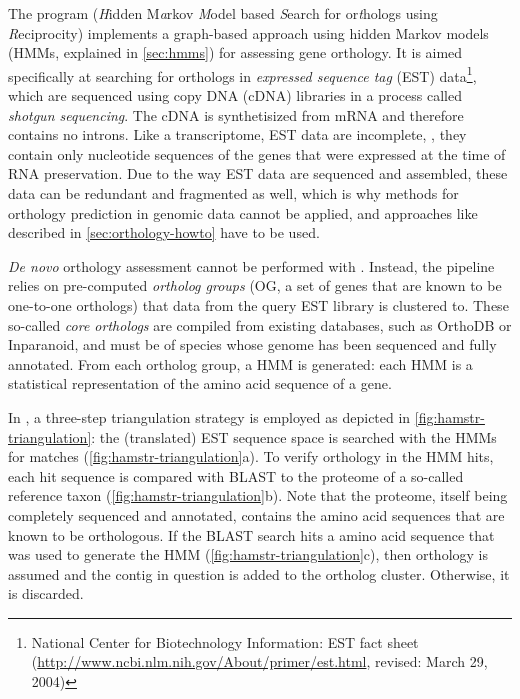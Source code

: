 \label{sec:hamstr}
The program \hamstr (\emph{H}idden M\emph{a}rkov \emph{M}odel based
\emph{S}earch for or\emph{t}hologs using \emph{R}eciprocity) implements a
graph-based approach using hidden Markov models (HMMs, explained in
\autoref{sec:hmms}) for assessing gene orthology. It is aimed specifically at
searching for orthologs in \emph{expressed sequence tag} (EST)
data\footnote{National Center for Biotechnology Information: EST fact sheet
(\url{http://www.ncbi.nlm.nih.gov/About/primer/est.html}, revised: March 29,
2004)}, which are sequenced using copy DNA (cDNA) libraries in a process called
\emph{shotgun sequencing}. The cDNA is synthetisized from mRNA and therefore
contains no introns. Like a transcriptome, EST data are incomplete, \ie, they
contain only nucleotide sequences of the genes that were expressed at the time
of RNA preservation. Due to the way EST data are sequenced and assembled, these
data can be redundant and fragmented as well, which is why methods for orthology
prediction in genomic data cannot be applied, and approaches like described in
\autoref{sec:orthology-howto} have to be used.

\emph{De novo} orthology assessment cannot be performed with \hamstr. Instead,
the pipeline relies on pre-computed \emph{ortholog groups} (OG, a set of genes
that are known to be one-to-one orthologs) that data from the query EST library
is clustered to. These so-called \emph{core orthologs} are compiled from
existing databases, such as OrthoDB or Inparanoid, and must be of species 
whose genome has been sequenced and fully annotated.
From each ortholog group, a HMM is generated: each HMM is a statistical
representation of the amino acid sequence of a gene. 

In \hamstr, a three-step triangulation strategy is employed as depicted in
\autoref{fig:hamstr-triangulation}: the (translated) EST sequence space is
searched with the HMMs for matches (\autoref{fig:hamstr-triangulation}a). To
verify orthology in the HMM hits, each hit sequence is compared with BLAST
\citep{altschul1997} to the proteome of a so-called reference taxon
(\autoref{fig:hamstr-triangulation}b). Note that the proteome, itself being
completely sequenced and annotated, contains the amino acid sequences that are
known to be orthologous. If the BLAST search hits a amino acid sequence that was
used to generate the HMM (\autoref{fig:hamstr-triangulation}c), then orthology
is assumed and the contig in question is added to the ortholog cluster.
Otherwise, it is discarded.



